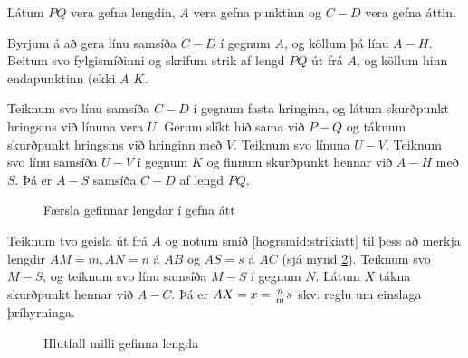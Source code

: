 \begin{frame}
  \begin{hogrsmid} \label{hogrsmid:strikiatt}
    Látum \(PQ\) vera gefna lengdin, \(A\) vera gefna punktinn og
    \(C-D\) vera gefna áttin.

    Byrjum á að gera línu samsíða \(C-D\) í gegnum \(A\), og köllum þá línu
    \(A-H\).
    Beitum svo fylgismíðinni og skrifum strik af lengd \(PQ\) út frá \(A\),
    og köllum hinn endapunktinn (ekki \(A\) \(K\).

    Teiknum svo línu samsíða \(C-D\) í gegnum fasta hringinn, og látum skurðpunkt hringsins
    við línuna vera \(U\). Gerum slíkt hið sama við \(P-Q\) og táknum skurðpunkt
    hringsins við hringinn með \(V\). Teiknum svo línuna \(U-V\). Teiknum
    svo línu samsíða \(U-V\) í gegnum \(K\) og finnum skurðpunkt hennar við
    \(A-H\) með \(S\). Þá er \(A-S\) samsíða \(C-D\) af lengd \(PQ\).
  \end{hogrsmid}
\end{frame}


\begin{frame}
  \begin{figure}[H]
    \centering
    \caption{Færsla gefinnar lengdar í gefna átt}
    \label{fig:gefinatt}
  \end{figure}
\end{frame}

\begin{frame}
  \begin{hogrsmid}[Finnum hlutfallið milli gefinna lengda n,m og s, x = \(\f{n}{m}s\)]\label{hogrsmid:hlutfall}
    Teiknum tvo geisla út frá \(A\)
    og  notum smíð \ref{hogrsmid:strikiatt}
    til þess að merkja lengdir \(AM =m, AN = n\) á \(AB\) og \(AS = s\) á \(AC\)
    (sjá mynd \ref{fig:hlutfall}). Teiknum svo \(M-S\), og teiknum svo
    línu samsíða \(M-S\) í gegnum \(N\). Látum \(X\) tákna skurðpunkt
    hennar við \(A-C\). Þá er \(AX = x = \frac{n}{m}{s}\) skv. reglu um einslaga þríhyrninga.
  \end{hogrsmid}
\end{frame}

\begin{frame}
  \begin{figure}[H]
    \centering

    \caption{Hlutfall milli gefinna lengda}
    \label{fig:hlutfall}
  \end{figure}
\end{frame}

